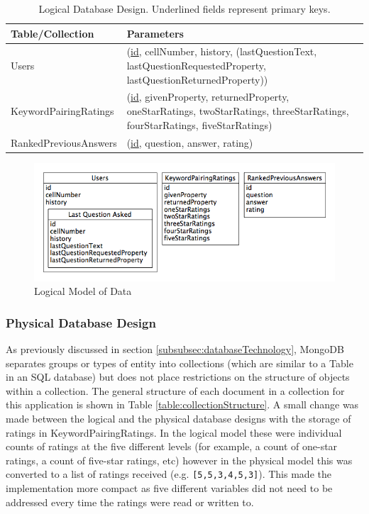 \documentclass[authoryearcitations]{UoYCSproject}
\begin{document}
\begin{table}
\begin{center}
    \begin{tabular}{| l | p{6cm} |}
    \hline
    Table/Collection & Parameters \\ \hline
    Users & (\underline{id}, cellNumber, history, (lastQuestionText, lastQuestionRequestedProperty, lastQuestionReturnedProperty)) \\ \hline
    KeywordPairingRatings & (\underline{id}, givenProperty, returnedProperty, oneStarRatings, twoStarRatings, threeStarRatings, fourStarRatings, fiveStarRatings) \\ \hline
    RankedPreviousAnswers & (\underline{id}, question, answer, rating) \\ \hline
    \end{tabular}
    \caption{Logical Database Design.  Underlined fields represent primary keys.}
    \label{table:logicalDatabaseDesignListing}
\end{center}
\end{table}

\begin{figure}[htb] 
\includegraphics[width=\linewidth]{logicalModel}
\caption{Logical Model of Data}
\label{fig:logicalDatabaseDesignDiagram}
\end{figure}

\subsubsection{Physical Database Design}
\label{subsubsec:physicalDatabaseDesign}
As previously discussed in section \ref{subsubsec:databaseTechnology}, MongoDB separates groups or types of entity into collections (which are similar to a Table in an SQL database) but does not place restrictions on the structure of objects within a collection.  The general structure of each document in a collection for this application is shown in Table \ref{table:collectionStructure}. A small change was made between the logical and the physical database designs with the storage of ratings in KeywordPairingRatings. In the logical model these were individual counts of ratings at the five different levels (for example, a count of one-star ratings, a count of five-star ratings, etc) however in the physical model this was converted to a list of ratings received (e.g. \texttt{[5,5,3,4,5,3]}). This made the implementation more compact as five different variables did not need to be addressed every time the ratings were read or written to.
\end{document}
